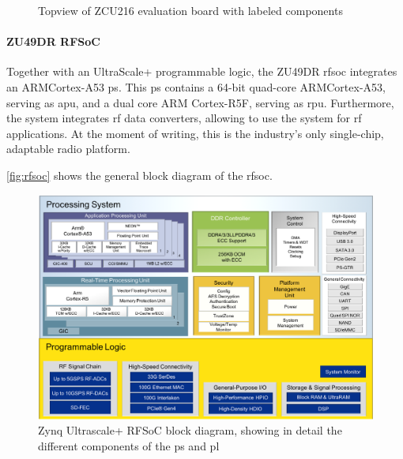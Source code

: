 \begin{figure}[tb]
{}
	\caption{Topview of ZCU216 evaluation board with labeled components \cite{zcu216}}
	\label{fig:zcu216}
\end{figure}

\paragraph{ZU49DR RFSoC}
Together with an UltraScale+ programmable logic, the ZU49DR \gls{rfsoc} integrates an ARM\textregistered Cortex\texttrademark-A53 \gls{ps}.
This \gls{ps} contains a 64-bit quad-core ARM\textregistered Cortex\texttrademark-A53, serving as \gls{apu}, and a dual core ARM Cortex-R5F, serving as \gls{rpu}.
Furthermore, the system integrates \gls{rf} data converters, allowing to use the system for \gls{rf} applications.
At the moment of writing, this is the industry's only single-chip, adaptable radio platform. \cite{zu49}

\autoref{fig:rfsoc} shows the general block diagram of the \gls{rfsoc}.

\begin{figure}[tb]
	\centering
	\includegraphics[width = \textwidth]{chap/05-readout/img/rfsoc_blockdiagram}
	\caption[Zynq Ultrascale+ RFSoC block diagram]{Zynq Ultrascale+ RFSoC block diagram, showing in detail the different components of the \gls{ps} and \gls{pl}}
	\label{fig:rfsoc}
\end{figure}


